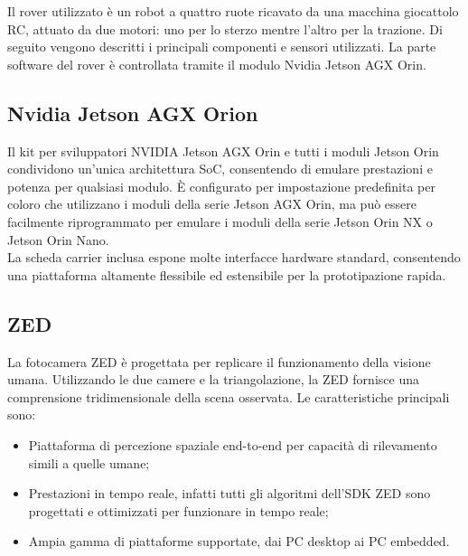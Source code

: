 \label{sec:desc_tec}
Il rover utilizzato è un robot a quattro ruote ricavato da una macchina giocattolo RC, attuato da due motori: uno per lo sterzo mentre l'altro per la trazione. Di seguito vengono descritti i principali componenti e sensori utilizzati. La parte software del rover è controllata tramite il modulo Nvidia Jetson AGX Orin.

\subsection{Nvidia Jetson AGX Orion}
Il kit per sviluppatori NVIDIA Jetson AGX Orin  \cite{Nvidia} e tutti i moduli Jetson Orin condividono un'unica architettura SoC, consentendo di emulare prestazioni e potenza per qualsiasi modulo. È configurato per impostazione predefinita per coloro che utilizzano i moduli della serie Jetson AGX Orin, ma può essere facilmente riprogrammato per emulare i moduli della serie Jetson Orin NX o Jetson Orin Nano. \\
La scheda carrier inclusa espone molte interfacce hardware standard, consentendo una piattaforma altamente flessibile ed estensibile per la prototipazione rapida.

\subsection{ZED}
La fotocamera ZED \cite{ZED} è progettata per replicare il funzionamento della visione umana. Utilizzando le due camere e la triangolazione, la ZED fornisce una comprensione tridimensionale della scena osservata.
Le caratteristiche principali sono:
\begin{itemize}
    \item Piattaforma di percezione spaziale end-to-end per capacità di rilevamento simili a quelle umane;
    \item Prestazioni in tempo reale, infatti tutti gli algoritmi dell'SDK ZED sono progettati e ottimizzati per funzionare in tempo reale;
    \item Ampia gamma di piattaforme supportate, dai PC desktop ai PC embedded.
\end{itemize}

